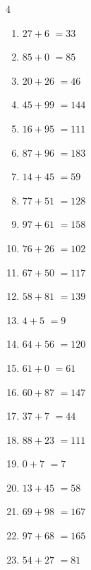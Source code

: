 \begin{multicols}{4}
\begin{enumerate}
  \item $27+6$
        $=33$

  \item $85+0$
        $=85$

  \item $20+26$
        $=46$

  \item $45+99$
        $=144$

  \item $16+95$
        $=111$

  \item $87+96$
        $=183$

  \item $14+45$
        $=59$

\columnbreak %

  \item $77+51$
        $=128$

  \item $97+61$
        $=158$

  \item $76+26$
        $=102$

  \item $67+50$
        $=117$

  \item $58+81$
        $=139$

  \item $4+5$
        $=9$

  \item $64+56$
        $=120$

  \item $61+0$
        $=61$

  \item $60+87$
        $=147$

  \item $37+7$
        $=44$

  \item $88+23$
        $=111$

  \item $0+7$
        $=7$

  \item $13+45$
        $=58$

  \item $69+98$
        $=167$

  \item $97+68$
        $=165$

  \item $54+27$
        $=81$


\end{enumerate}
\end{multicols}
